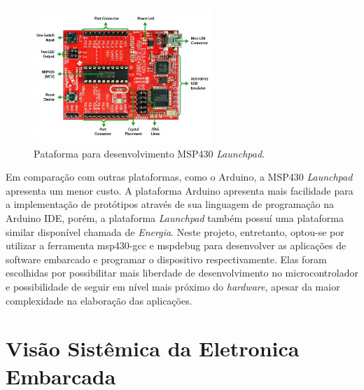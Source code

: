 \begin{figure}[h]
  \centering
  \includegraphics[width=0.6\textwidth]
      {figuras/Launchpad.jpg}
  \caption{Pataforma para desenvolvimento MSP430 \textit{Launchpad}.}
  \label{Launchpad}
\end{figure}
Em comparação com outras plataformas, como o Arduino, a MSP430 \textit{Launchpad} apresenta um menor custo. A plataforma Arduino apresenta mais facilidade para a implementação de protótipos através de sua linguagem de programação na Arduino IDE, porém, a plataforma \textit{Launchpad} também possuí uma plataforma similar disponível chamada de \textit{Energia}. Neste projeto, entretanto, optou-se por utilizar a ferramenta msp430-gcc e mspdebug para desenvolver as aplicações de software embarcado e programar o dispositivo respectivamente. Elas foram escolhidas por possibilitar mais liberdade de desenvolvimento no microcontrolador e possibilidade de seguir em nível mais próximo do \textit{hardware}, apesar da maior complexidade na elaboração das aplicações.







\section{Visão Sistêmica da Eletronica Embarcada} %
\label{sec:visao_sistemica}

